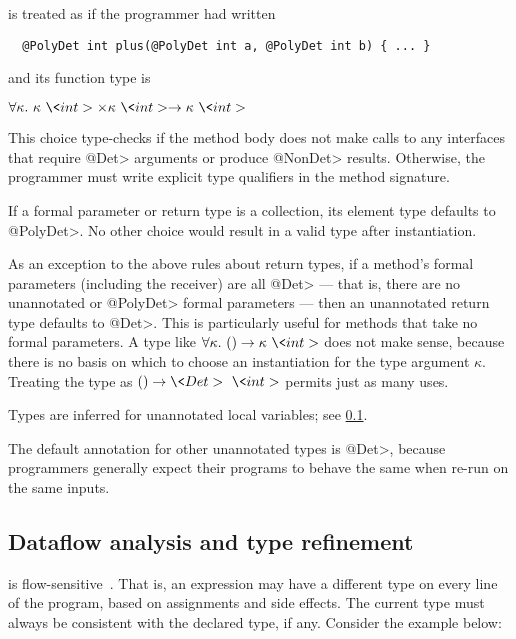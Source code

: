 \noindent
is treated as if the programmer had written

\begin{Verbatim}
  @PolyDet int plus(@PolyDet int a, @PolyDet int b) { ... }
\end{Verbatim}

\noindent
and its function type is

$\forallt{\kappa}  \kappa\ \<int> \times \kappa\ \<int> \rightarrow \kappa\ \<int>$

\noindent
This choice type-checks if the method body does not make calls to any
interfaces that require \<@Det> arguments or produce \<@NonDet> results.
Otherwise, the programmer must write explicit type qualifiers in the method
signature.

If a formal parameter or return type is a collection, its element type
defaults to \<@PolyDet>.  No other choice would result in a valid type
after instantiation.

As an exception to the above rules about return types, if a method's formal
parameters (including the receiver) are all \<@Det> --- that is, there are
no unannotated or \<@PolyDet> formal parameters --- then an unannotated
return type defaults to \<@Det>.  This is particularly useful for methods
that take no formal parameters.  A type like $\forallt{\kappa} ()
\rightarrow \kappa\ \<int>$ does not make sense, because there is no basis
on which to choose an
instantiation for the type argument $\kappa$.  Treating the type as $()
\rightarrow \<Det>\ \<int>$ permits just as many uses.

Types are inferred for unannotated local variables; see \cref{sec:dataflow-java}.

The default annotation for other unannotated types is \<@Det>, because
programmers generally expect their programs to behave the same when re-run
on the same inputs.



\subsection{Dataflow analysis and type refinement}\label{sec:dataflow-java}

\OurTypeSystem is
flow-sensitive~\cite{Hunt:2006:FST:1111037.1111045,Adams:2011:FTR:2048066.2048105,Sui:2016:OSU:2950290.2950296}.
That is, an expression may have
a different type on every line of the program, based on assignments and
side effects.  The current type must always be consistent with the declared
type, if any.
Consider the example below:

